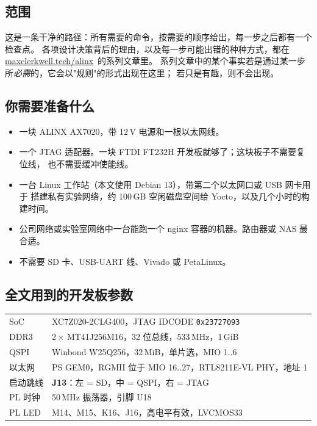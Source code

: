 \documentclass[11pt,a4paper,oneside]{article}
\newcommand{\cmd}[1]{\texttt{#1}}
\newcommand{\series}{\href{https://maxclerkwell.tech/alinx/}{maxclerkwell.tech/alinx}}
\begin{document}
\subsection{范围}

这是一条干净的路径：所有需要的命令，按需要的顺序给出，每一步之后都有一个检查点。
各项设计决策背后的理由，以及每一步可能出错的种种方式，都在 \series\ 的系列文章里。
系列文章中的某个事实若是通过某一步所\emph{必需}的，它会以"规则"的形式出现在这里；
若只是有趣，则不会出现。

\subsection{你需要准备什么}

\begin{itemize}
  \item 一块 ALINX AX7020，带 12\,V 电源和一根以太网线。
  \item 一个 JTAG 适配器。一块 FTDI FT232H 开发板就够了；这块板子不需要复位线，
        也不需要缓冲使能线。
  \item 一台 Linux 工作站（本文使用 Debian 13），带第二个以太网口或 USB 网卡用于
        搭建私有实验网络，约 100\,GB 空闲磁盘空间给 Yocto，以及几个小时的构建时间。
  \item 公司网络或实验室网络中一台能跑一个 nginx 容器的机器。路由器或 NAS 最合适。
  \item 不需要 SD 卡、USB-UART 线、Vivado 或 PetaLinux。
\end{itemize}

\subsection{全文用到的开发板参数}

\begin{center}\small
\begin{tabular}{@{}ll@{}}
\toprule
SoC & XC7Z020-2CLG400，JTAG IDCODE \cmd{0x23727093} \\
DDR3 & 2\,$\times$ MT41J256M16，32 位总线，533\,MHz，1\,GiB \\
QSPI & Winbond W25Q256，32\,MiB，单片选，MIO 1..6 \\
以太网 & PS GEM0，RGMII 位于 MIO 16..27，RTL8211E-VL PHY，地址 1 \\
启动跳线 & \textbf{J13}：左 = SD，中 = QSPI，右 = JTAG \\
PL 时钟 & 50\,MHz 振荡器，引脚 U18 \\
PL LED & M14、M15、K16、J16，高电平有效，LVCMOS33 \\
\bottomrule
\end{tabular}
\end{center}
\end{document}
